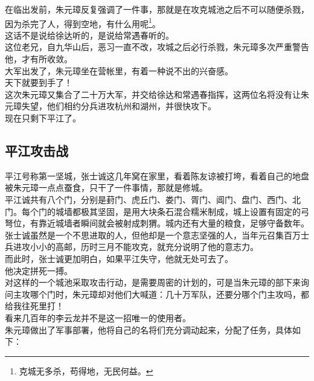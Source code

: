 \begin{multicols}{\theparacolNo}
在临出发前，朱元璋反复强调了一件事，那就是在攻克城池之后不可以随便杀戮，因为杀完了人，得到空地，有什么用呢\footnote{克城无多杀，苟得地，无民何益。}。\\

这话不是说给徐达听的，是说给常遇春听的。\\

这位老兄，自九华山后，恶习一直不改，攻城之后必行杀戮，朱元璋多次严重警告他，才有所收敛。\\

大军出发了，朱元璋坐在营帐里，有着一种说不出的兴奋感。\\

天下就要到手了！\\

这次朱元璋又集合了二十万大军，并交给徐达和常遇春指挥，这两位名将没有让朱元璋失望，他们相约分兵进攻杭州和湖州，并很快攻下。\\

现在只剩下平江了。\\

\subsection{平江攻击战}
平江号称第一坚城，张士诚这几年窝在家里，看着陈友谅被打垮，看着自己的地盘被朱元璋一点点蚕食，只干了一件事情，那就是修城。\\

平江诚共有八个门，分别是葑门、虎丘门、娄门、胥门、阊门、盘门、西门、北门。每个门的城墙都极其坚固，是用大块条石混合糯米制成，城上设置有固定的弓弩位，有靠近城墙者瞬间就会被射成刺猬。城内还有大量的粮食，足够守备数年。\\

张士诚虽然是一个不思进取的人，但他却是一个意志坚强的人，当年元召集百万士兵进攻小小的高邮，历时三月不能攻克，就充分说明了他的意志力。\\

而此时，张士诚更加明白，如果平江失守，他就无处可去了。\\

他决定拼死一搏。\\

对这样的一个城池采取攻击行动，是需要周密的计划的，可是当朱元璋的部下来询问主攻哪个门时，朱元璋却对他们大喊道：几十万军队，还要分哪个门主攻吗，都给我往死里打！\\

看来几百年的李云龙并不是这一招唯一的使用者。\\

朱元璋做出了军事部署，他将自己的名将们充分调动起来，分配了任务，具体如下：\\


\end{multicols}
